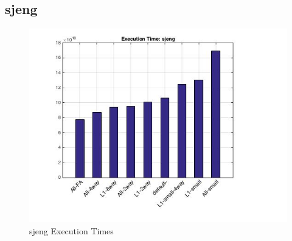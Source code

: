 \documentclass[11pt,titlepage]{article}
\begin{document}
    \subsection{sjeng}
        \begin{figure}[H]
            \centering
            \includegraphics[scale=0.75]{etsjeng}
            \caption{sjeng Execution Times}
            \label{fig:etsjeng}
        \end{figure}
\end{document}
